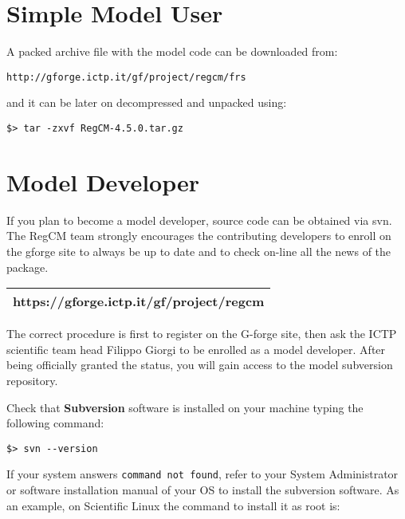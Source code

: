 %
%

\section{Simple Model User}

A packed archive file with the model code can be downloaded from:

\begin{Verbatim}
http://gforge.ictp.it/gf/project/regcm/frs
\end{Verbatim}

and it can be later on decompressed and unpacked using:

\begin{Verbatim}
$> tar -zxvf RegCM-4.5.0.tar.gz
\end{Verbatim}

\section{Model Developer}

If you plan to become a model developer, source code can be obtained via svn.
The RegCM team strongly encourages the contributing developers to enroll on
the gforge site to always be up to date and to check on-line all the news of
the package.

\vspace{0.5cm}
\begin{tabular}{|c|}
\hline
{\bf https://gforge.ictp.it/gf/project/regcm} \\
\hline
\end{tabular}
\vspace{0.5cm}

The correct procedure is first to register on the G-forge site, then ask
the ICTP scientific team head Filippo Giorgi to be enrolled as a model
developer. After being officially granted the status, you will gain
access to the model subversion repository.

Check that {\bf Subversion} software is installed on your machine typing
the following command:

\begin{verbatim}
$> svn --version
\end{verbatim}

If your system answers \verb=command not found=, refer to your System
Administrator or software installation manual of your OS to install the
subversion software. As an example, on Scientific Linux the command
to install it as root is:

